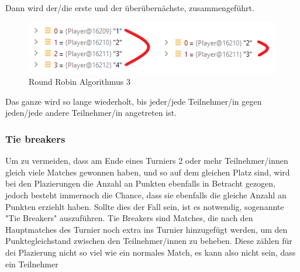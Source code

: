 Dann wird der/die erste und der überübernächste, zusammengeführt.

\begin{figure}[H]
    \includegraphics[scale=0.8]{pics/backend/roundrobin/matching_up_3.png}
    \caption{Round Robin Algorithmus 3}
\end{figure}

Das ganze wird so lange wiederholt, bis jeder/jede Teilnehmer/in gegen jeden/jede andere Teilnehmer/in angetreten ist.

\subsubsection{Tie breakers}

Um zu vermeiden, dass am Ende eines Turniers 2 oder mehr Teilnehmer/innen gleich viele Matches gewonnen haben, und so auf dem gleichen Platz sind, 
wird bei den Plazierungen die Anzahl an Punkten ebenfalls in Betracht gezogen, jedoch besteht immernoch die Chance, dass sie ebenfalls die gleiche Anzahl an 
Punkten erziehlt haben. Sollte dies der Fall sein, ist es notwendig, sogenannte "Tie Breakers" auszuführen. Tie Breakers sind Matches, die nach den Hauptmatches 
des Turnier noch extra ins Turnier hinzugefügt werden, um den Punktegleichstand zwischen den Teilnehmer/innen zu beheben. Diese zählen für dei Plazierung nicht 
so viel wie ein normales Match, es kann also nicht sein, dass ein Teilnehmer 